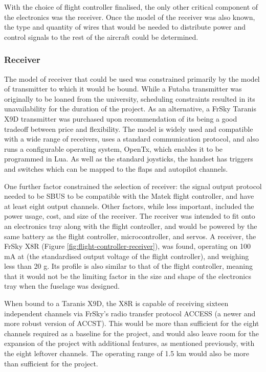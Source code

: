 \documentclass[../../main.tex]{subfiles}
\begin{document}
With the choice of flight controller finalised, the only other critical component of the electronics was the receiver.
Once the model of the receiver was also known, the type and quantity of wires that would be needed to distribute power and control signals to the rest of the aircraft could be determined.

\subsubsection{Receiver} \label{sec:design-process:revised-design:electronics:receiver}

The model of receiver that could be used was constrained primarily by the model of transmitter to which it would be bound.
While a Futaba transmitter was originally to be loaned from the university, scheduling constraints resulted in its unavailability for the duration of the project.
As an alternative, a FrSky Taranis X9D transmitter was purchased upon recommendation of its being a good tradeoff between price and flexibility.
The model is widely used and compatible with a wide range of receivers, uses a standard communication protocol, and also runs a configurable operating system, OpenTx, which enables it to be programmed in Lua.
As well as the standard joysticks, the handset has triggers and switches which can be mapped to the flaps and autopilot channels. 

One further factor constrained the selection of receiver: the signal output protocol needed to be SBUS to be compatible with the Matek flight controller, and have at least eight output channels.
Other factors, while less important, included the power usage, cost, and size of the receiver.
The receiver was intended to fit onto an electronics tray along with the flight controller, and would be powered by the same battery as the flight controller, microcontroller, and servos.
A receiver, the FrSky X8R (Figure \ref{fig:flight-controller-receiver}), was found, operating on 100 mA at  (the standardised output voltage of the flight controller), and weighing less than 20 g.
Its profile is also similar to that of the flight controller, meaning that it would not be the limiting factor in the size and shape of the electronics tray when the fuselage was designed. 


When bound to a Taranis X9D, the X8R is capable of receiving sixteen independent channels via FrSky's radio transfer protocol ACCESS (a newer and more robust version of ACCST).
This would be more than sufficient for the eight channels required as a baseline for the project, and would also leave room for the expansion of the project with additional features, as mentioned previously, with the eight leftover channels.
The operating range of 1.5 km would also be more than sufficient for the project. 
\end{document}

